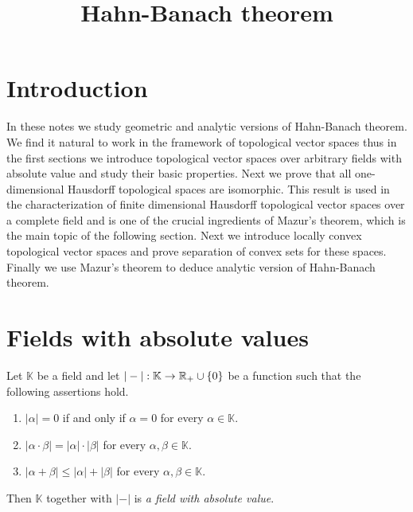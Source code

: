 



\title{Hahn-Banach theorem}
\date{}
\maketitle

\section{Introduction}
\noindent
In these notes we study geometric and analytic versions of Hahn-Banach theorem. We find it natural to work in the framework of topological vector spaces thus in the first sections we introduce topological vector spaces over arbitrary fields with absolute value and study their basic properties. Next we prove that all one-dimensional Hausdorff topological spaces are isomorphic. This result is used in the characterization of finite dimensional Hausdorff topological vector spaces over a complete field and is one of the crucial ingredients of Mazur's theorem, which is the main topic of the following section. Next we introduce locally convex topological vector spaces and prove separation of convex sets for these spaces. Finally we use Mazur's theorem to deduce analytic version of Hahn-Banach theorem.

\section{Fields with absolute values}

\begin{definition}
Let $\mathbb{K}$ be a field and let $|-|:\mathbb{K}\rightarrow {\mathbb R}_+\cup \{0\}$ be a function such that the following assertions hold.
\begin{enumerate}[label=\textbf{(\arabic*)}, leftmargin=*]
\item $|\alpha| = 0$ if and only if $\alpha = 0$ for every $\alpha \in \mathbb{K}$.
\item $|\alpha\cdot \beta| = |\alpha|\cdot |\beta|$ for every $\alpha,\beta \in \mathbb{K}$.
\item $|\alpha + \beta|\leq |\alpha| + |\beta|$ for every $\alpha,\beta \in \mathbb{K}$.
\end{enumerate}
Then $\mathbb{K}$ together with $|-|$ is \textit{a field with absolute value}.
\end{definition}

